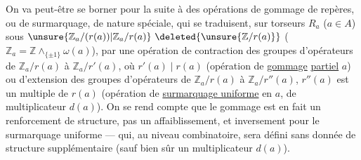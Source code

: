 On va peut-être se borner pour la suite à des opérations de gommage de repères, ou de surmarquage, de nature spéciale, qui se traduisent, sur   torseurs $R_{a}$ ($a\in A$)  sous $\unsure{\mathbb{Z}_{a}/(r(a))|\mathbb{Z}_{a}/r(a)}\ \deleted{\unsure{\mathbb{Z}/r(a)}}$ ($\mathbb{Z}_{a}=\mathbb{Z}\wedge_{\{\pm1\}}\omega(a)$), par une opération de contraction des groupes d'opérateurs de $\mathbb{Z}_{a}/r(a)$ à $\mathbb{Z}_{a}/r'(a)$, où $r'(a)\mid r(a)$ (opération de \uline{gommage} \uline{partiel}   $a$) ou d'extension des groupes d'opérateurs de $\mathbb{Z}_{a}/r(a)$ à $\mathbb{Z}_{a}/r''(a)$,  $r''(a)$  est un multiple de $r(a)$ (opération de \uline{surmarquage uniforme} en $a$, \deleted{\unsure{)}} de multiplicateur $d(a)$). On se rend compte  que le gommage  est en fait un renforcement de structure, pas un affaiblissement, et inversement pour le surmarquage uniforme --- qui, au niveau combinatoire, sera défini sans donnée de structure supplémentaire (sauf bien sûr un multiplicateur $d(a)$).
